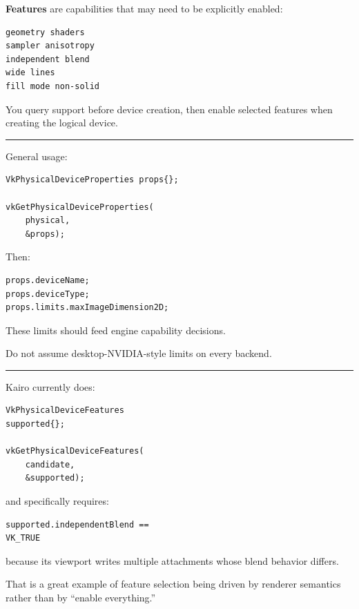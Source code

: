 \textbf{Features} are capabilities that may need to be explicitly enabled:

\begin{verbatim}
geometry shaders
sampler anisotropy
independent blend
wide lines
fill mode non-solid
\end{verbatim}

You query support before device creation, then enable selected features when creating the logical device.

\begin{center}\rule{0.5\linewidth}{0.5pt}\end{center}

\textbf{}

General usage:

\begin{verbatim}
VkPhysicalDeviceProperties props{};

vkGetPhysicalDeviceProperties(
    physical,
    &props);
\end{verbatim}

Then:

\begin{verbatim}
props.deviceName;
props.deviceType;
props.limits.maxImageDimension2D;
\end{verbatim}

These limits should feed engine capability decisions.

Do not assume desktop-NVIDIA-style limits on every backend.

\begin{center}\rule{0.5\linewidth}{0.5pt}\end{center}

\textbf{}

Kairo currently does:

\begin{verbatim}
VkPhysicalDeviceFeatures
supported{};

vkGetPhysicalDeviceFeatures(
    candidate,
    &supported);
\end{verbatim}

and specifically requires:

\begin{verbatim}
supported.independentBlend ==
VK_TRUE
\end{verbatim}

because its viewport writes multiple attachments whose blend behavior differs.

That is a great example of feature selection being driven by renderer semantics rather than by ``enable everything.''

